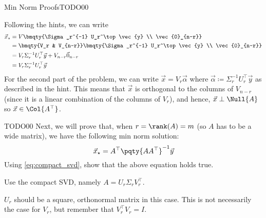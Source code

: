 \begin{problem}{Min Norm Proofs}{TODO}{0}{0}
\begin{problempartlist}
        \begin{solution}{0in}
            Following the hints, we can write
            \begin{align}
                \vec{x}_{\star} &= V \bmqty{\Sigma_r^{-1} U_r^\top \vec{y} \\ \vec{0}_{n-r}} \\
                &= \bmqty{V_r & V_{n-r}} \bmqty{\Sigma_r^{-1} U_r^\top \vec{y} \\ \vec{0}_{n-r}} \\
                &= V_r \Sigma_r^{-1} U_r^\top \vec{y} + V_{n-r} \vec{0}_{n-r} \\
                &= V_r \Sigma_r^{-1} U_r^\top \vec{y}
            \end{align}
            For the second part of the problem, we can write $\vec{x} = V_r \vec{\alpha}$ where $\vec{\alpha} \coloneqq \Sigma_r^{-1} U_r^\top \vec{y}$ as described in the hint. This means that $\vec{x}$ is orthogonal to the columns of $V_{n-r}$ (since it is a linear combination of the columns of $V_r$), and hence, $\vec{x} \perp \Null{A}$ so $\vec{x} \in \Col{A^\top}$.
        \end{solution}

        \begin{problempart}{TODO}{0}{0}
            Next, we will prove that, when $r = \rank(A) = m$ (so $A$ has to be a wide matrix), we have the following min norm solution:
            \begin{equation}
                \label{eq:min_norm_desired}
                \vec{x}_{\star} = A^\top \pqty{A A^\top}^{-1} \vec{y}
            \end{equation}
            Using \cref{eq:compact_svd}, show that the above equation holds true.
            \begin{hint}
                Use the compact SVD, namely $A = U_r \Sigma_r V_r^\top$.
            \end{hint}
            \begin{hint}
                $U_r$ should be a square, orthonormal matrix in this case. This is not necessarily the case for $V_r$, but remember that $V_r^\top V_r = I$.
            \end{hint}
        \end{problempart}


\end{problempartlist}
\end{problem}
